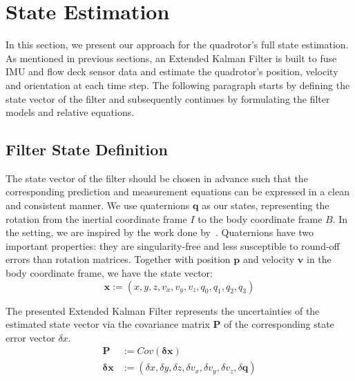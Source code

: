 \documentclass[letterpaper, 10 pt, conference]{ieeeconf}  %
\begin{document}
\section{State Estimation}  
In this section, we present our approach for the quadrotor's full state estimation. As mentioned in previous sections, an Extended Kalman Filter is built to fuse IMU and flow deck sensor data and estimate the quadrotor's position, velocity and orientation at each time step. The following paragraph starts by defining the state vector of the filter and subsequently continues by formulating the filter models and relative equations.   

\subsection{Filter State Definition} 

The state vector of the filter should be chosen in advance such that the corresponding prediction and measurement equations can be expressed in a clean and consistent manner. We use quaternions $\bm{q}$ as our states, representing the rotation from the inertial coordinate frame $I$ to the body coordinate frame $B$. In the setting, we are inspired by the work done by~\cite{bloesch2013state}. Quaternions have two important properties: they are singularity-free and less susceptible to round-off errors than rotation matrices. 
Together with position $\bm{p}$ and velocity $\bm{v}$ in the body coordinate frame, we have the state vector:
\begin{equation}
\bm{x}:=\left(x,y,z,v_x,v_y,v_z,q_0,q_1,q_2,q_3\right)
\end{equation}
 
The presented Extended Kalman Filter represents the uncertainties of the estimated state vector via the covariance matrix $\bm{P}$ of the corresponding state error vector $\delta x$. 
\begin{equation}
\begin{split}
\bm{P} &:= Cov(\bm{\delta x})  \\
\bm{\delta x} &:=\left(\delta x,\delta y,\delta z,\delta v_x,\delta v_y,\delta v_z,\delta \bm{q}\right)
\end{split}
\end{equation}
\end{document}
